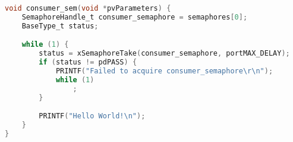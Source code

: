 \begin{lstlisting}[language=c,caption=Problem 6 Print Task, label=list:p6_print]
void consumer_sem(void *pvParameters) {
    SemaphoreHandle_t consumer_semaphore = semaphores[0];
    BaseType_t status;

    while (1) {
        status = xSemaphoreTake(consumer_semaphore, portMAX_DELAY);
        if (status != pdPASS) {
            PRINTF("Failed to acquire consumer_semaphore\r\n");
            while (1)
                ;
        }

        PRINTF("Hello World!\n");
    }
}
\end{lstlisting}
